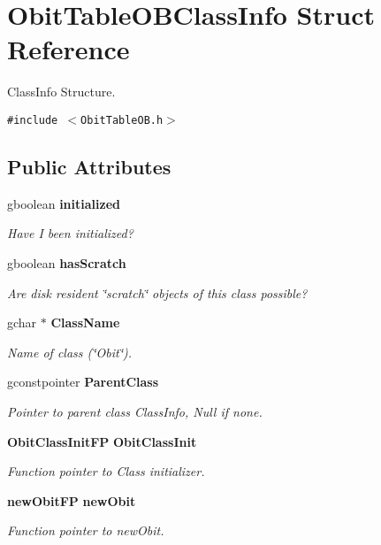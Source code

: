 \section{Obit\-Table\-OBClass\-Info Struct Reference}
\label{structObitTableOBClassInfo}
Class\-Info Structure.  


{\tt \#include $<$Obit\-Table\-OB.h$>$}

\subsection*{Public Attributes}
\begin{CompactItemize}
\item 
gboolean {\bf initialized}
\begin{CompactList}\small\item\em Have I been initialized? \item\end{CompactList}\item 
gboolean {\bf has\-Scratch}
\begin{CompactList}\small\item\em Are disk resident \char`\"{}scratch\char`\"{} objects of this class possible? \item\end{CompactList}\item 
gchar $\ast$ {\bf Class\-Name}
\begin{CompactList}\small\item\em Name of class (\char`\"{}Obit\char`\"{}). \item\end{CompactList}\item 
gconstpointer {\bf Parent\-Class}
\begin{CompactList}\small\item\em Pointer to parent class Class\-Info, Null if none. \item\end{CompactList}\item 
{\bf Obit\-Class\-Init\-FP} {\bf Obit\-Class\-Init}
\begin{CompactList}\small\item\em Function pointer to Class initializer. \item\end{CompactList}\item 
{\bf new\-Obit\-FP} {\bf new\-Obit}
\begin{CompactList}\small\item\em Function pointer to new\-Obit. \item\end{CompactList}\item 

\end{CompactItemize}
